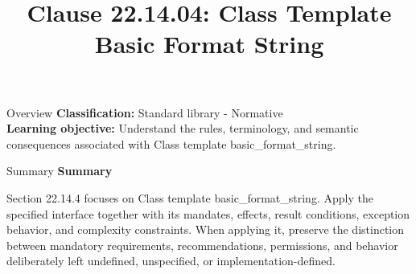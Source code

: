 \documentclass[10pt,letterpaper]{article}
\title{Clause 22.14.04: Class Template Basic Format String}
\author{}
\date{}
\begin{document}
\maketitle
\begin{CornellOverviewBox}{Overview}
\textbf{Classification:} Standard library - Normative\\[2pt]
\textbf{Learning objective:} Understand the rules, terminology, and semantic consequences associated with Class template basic\_format\_string.
\end{CornellOverviewBox}\begin{CornellSummaryBox}{Summary}
{\sffamily\bfseries\color{Accent} Summary}\par\vspace{3pt}Section 22.14.4 focuses on Class template basic\_format\_string. Apply the specified interface together with its mandates, effects, result conditions, exception behavior, and complexity constraints. When applying it, preserve the distinction between mandatory requirements, recommendations, permissions, and behavior deliberately left undefined, unspecified, or implementation-defined.
\end{CornellSummaryBox}
\end{document}
